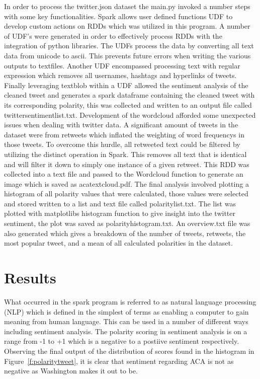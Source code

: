 In order to process the twitter.json dataset the main.py invoked a
number steps with some key functionalities.  Spark allows user defined
functions UDF to develop custom actions on RDDs which was utilized in
this program.  A number of UDF's were generated in order to
effectively process RDDs with the integration of python libraries.
The UDFs process the data by converting all text data from unicode to
ascii.  This prevents future errors when writing the various outputs
to textfiles.  Another UDF encompassed processing text with regular
expression which removes all usernames, hashtags and hyperlinks of
tweets.  Finally leveraging textblob within a UDF allowed the
sentiment analysis of the cleaned tweet and generates a spark
dataframe containing the cleaned tweet with its corresponding
polarity, this was collected and written to an output file called
twittersentimentlist.txt.  Development of the wordcloud afforded some
unexpected issues when dealing with twitter data.  A significant
amount of tweets in the dataset were from retweets which inflated the
weighting of word frequencys in those tweets.  To overcome this
hurdle, all retweeted text could be filtered by utilizing the distinct
operation in Spark.  This removes all text that is identical and will
filter it down to simply one instance of a given retweet.  This RDD
was collected into a text file and passed to the Wordcloud function to
generate an image which is saved as acatextcloud.pdf.  The final
analysis involved plotting a histogram of all polarity values that
were calculated, those values were selected and stored written to a
list and text file called polaritylist.txt.  The list was plotted with
matplotlibs histogram function to give insight into the twitter
sentiment, the plot was saved as polarityhistogram.txt.  An
overview.txt file was also generated which gives a breakdown of the
number of tweets, retweets, the most popular tweet, and a mean of all
calculated polarities in the dataset.




\section{Results}

What occurred in the spark program is referred to as natural language
processing (NLP) which is defined in the simplest of terms as enabling
a computer to gain meaning from human language.  This can be used in a
number of different ways including sentiment analysis.  The polarity
scoring in sentiment analysis is on a range from -1 to +1 which is a
negative to a postiive sentiment respectively.  Observing the final
output of the distribution of scores found in the histogram in
Figure~\ref{f:polaritytweet}, it is clear that sentiment regarding ACA
is not as negative as Washington makes it out to be.

